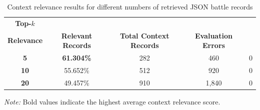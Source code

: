 \begin{table}[H]
    \centering
    \caption{Context relevance results for different numbers of retrieved JSON battle records}
    \label{tab:context_relevance}

    \small
    \renewcommand{\arraystretch}{1.5}
    \setlength{\tabcolsep}{8pt}

    \begin{tabular}{c c c c c}
        \toprule
        \textbf{Top-$k$} &
        \shortstack{\textbf{Average Context}\\\textbf{Relevance}} &
        \textbf{Relevant Records} &
        \textbf{Total Context Records} &
        \textbf{Evaluation Errors} \\
        \midrule

        \textbf{5} &
        \textbf{61.304\%} &
        282 &
        460 &
        0 \\

        \textbf{10} &
        55.652\% &
        512 &
        920 &
        0 \\

        \textbf{20} &
        49.457\% &
        910 &
        1,840 &
        0 \\

        \bottomrule
    \end{tabular}

    \par\vspace{4pt}
    \begin{minipage}{\linewidth}
        \footnotesize
        \textit{Note:} Bold values indicate the highest average
        context relevance score.
    \end{minipage}

\end{table}

